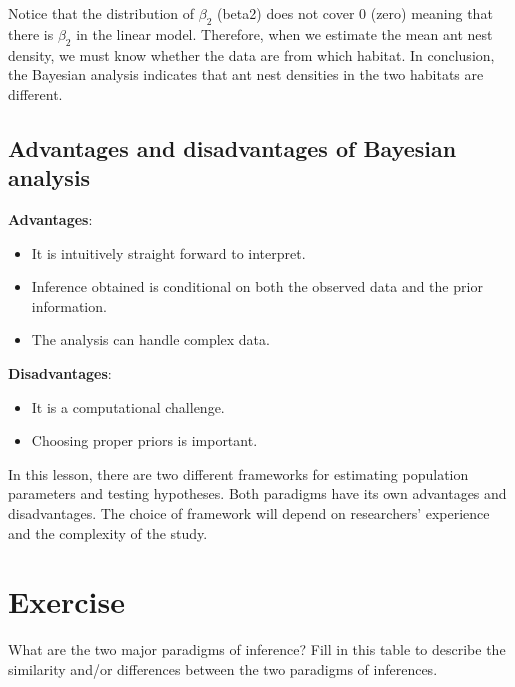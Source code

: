 \documentclass[
]{book}
\providecommand{\tightlist}{%
  \setlength{\itemsep}{0pt}\setlength{\parskip}{0pt}}
\begin{document}
Notice that the distribution of \(\beta_2\) (beta2) does not cover 0 (zero) meaning that there is \(\beta_2\) in the linear model. Therefore, when we estimate the mean ant nest density, we must know whether the data are from which habitat. In conclusion, the Bayesian analysis indicates that ant nest densities in the two habitats are different.

\subsection{Advantages and disadvantages of Bayesian analysis}\label{advantages-and-disadvantages-of-bayesian-analysis}

\textbf{Advantages}:

\begin{itemize}
\tightlist
\item
  It is intuitively straight forward to interpret.
\item
  Inference obtained is conditional on both the observed data and the prior information.
\item
  The analysis can handle complex data.
\end{itemize}

\textbf{Disadvantages}:

\begin{itemize}
\tightlist
\item
  It is a computational challenge.
\item
  Choosing proper priors is important.
\end{itemize}

In this lesson, there are two different frameworks for estimating population parameters and testing hypotheses. Both paradigms have its own advantages and disadvantages. The choice of framework will depend on researchers' experience and the complexity of the study.

\section{Exercise}\label{exercise}

What are the two major paradigms of inference?
Fill in this table to describe the similarity and/or differences between the two paradigms of inferences.
\end{document}
